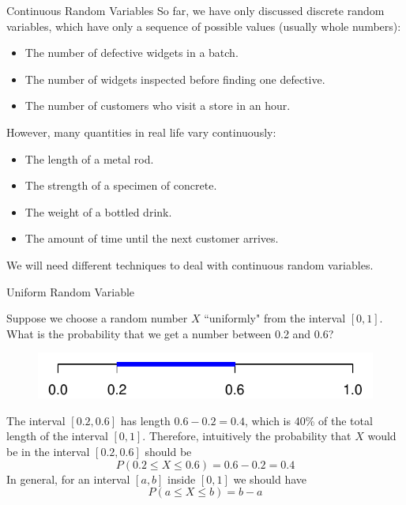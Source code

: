 \documentclass[handout]{beamer}
\begin{document}
\begin{frame}{Continuous Random Variables}
So far, we have only discussed discrete random variables, which have only a sequence of possible values (usually whole numbers):
\begin{itemize}
\item The number of defective widgets in a batch.
\item The number of widgets inspected before finding one defective.
\item The number of customers who visit a store in an hour.
\end{itemize}
However, many quantities in real life vary continuously:
\begin{itemize}
\item The length of a metal rod.
\item The strength of a specimen of concrete.
\item The weight of a bottled drink.
\item The amount of time until the next customer arrives.
\end{itemize}
We will need different techniques to deal with continuous random variables.
\end{frame}

\begin{frame}{Uniform Random Variable}
\begin{block}{}
Suppose we choose a random number $X$ ``uniformly" from the interval $[0,1]$. 
What is the probability that we get a number between 0.2 and 0.6?
\end{block}
\pause \begin{figure}[H]
\includegraphics{ch4_interval.pdf}
\end{figure}
\pause The interval $[0.2, 0.6]$ has length $0.6-0.2=0.4$, which is 40\% of the total length of the interval $[0,1]$. Therefore, intuitively the probability that $X$ would be in the interval $[0.2, 0.6]$ should be
$$ P(0.2 \leq X \leq 0.6) = 0.6-0.2 = 0.4$$
In general, for an interval $[a,b]$ inside $[0,1]$ we should have
$$ P(a \leq X \leq b) = b- a$$
\end{frame}
\end{document}
